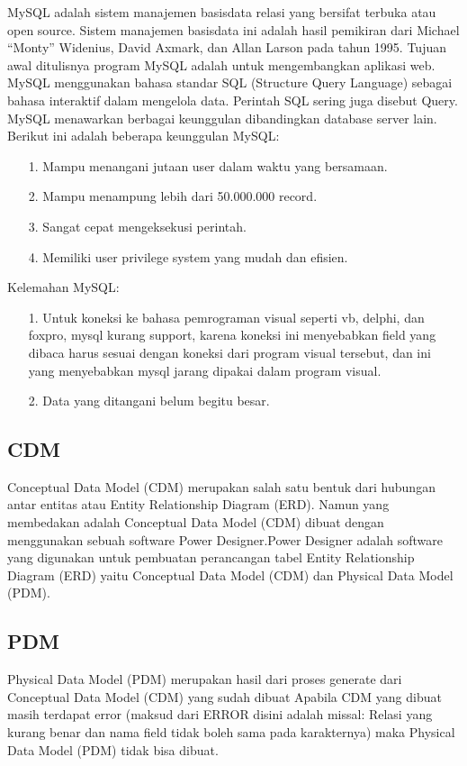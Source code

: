 \documentclass{jtetiproposalskripsi}
\begin{document}
MySQL adalah sistem manajemen basisdata relasi yang bersifat terbuka atau open source. Sistem manajemen basisdata ini adalah hasil pemikiran dari Michael “Monty” Widenius, David Axmark, dan Allan Larson pada tahun 1995. Tujuan awal ditulisnya program MySQL adalah untuk mengembangkan aplikasi web. MySQL menggunakan bahasa standar SQL (Structure Query Language) sebagai bahasa interaktif dalam mengelola data. 
Perintah SQL sering juga disebut Query. MySQL menawarkan berbagai keunggulan dibandingkan database server lain.
Berikut ini adalah beberapa keunggulan MySQL:
\begin{itemize}
\item[1.]Mampu menangani jutaan user dalam waktu yang bersamaan.
\item[2.]	Mampu menampung lebih dari 50.000.000 record.
\item[3.]	Sangat cepat mengeksekusi perintah.
\item[4.]	Memiliki user privilege system yang mudah dan efisien.
\end{itemize} 
Kelemahan MySQL:
\begin{itemize}
\item[1.]Untuk koneksi ke bahasa pemrograman visual seperti vb, delphi, dan foxpro, mysql kurang support, 			 karena koneksi ini menyebabkan field yang dibaca harus sesuai dengan koneksi dari program visual 	   		 tersebut, dan ini yang menyebabkan mysql jarang dipakai dalam program visual.
\item[2.]Data yang ditangani belum begitu besar.
\end{itemize}
	
\subsection{CDM} 	
          Conceptual Data Model (CDM) merupakan salah satu bentuk dari hubungan antar entitas atau Entity Relationship Diagram (ERD). Namun yang membedakan adalah Conceptual Data Model (CDM) dibuat dengan menggunakan sebuah software Power Designer.Power Designer adalah software yang digunakan untuk pembuatan perancangan tabel Entity Relationship Diagram (ERD) yaitu Conceptual Data Model (CDM) dan Physical Data Model (PDM).
\subsection{PDM}	
Physical Data Model (PDM) merupakan hasil dari proses generate dari Conceptual Data Model (CDM) yang sudah dibuat Apabila CDM yang dibuat masih terdapat error (maksud dari ERROR disini adalah missal: Relasi yang kurang benar dan nama field tidak boleh sama pada karakternya) maka Physical Data Model (PDM) tidak bisa dibuat.
\end{document}
